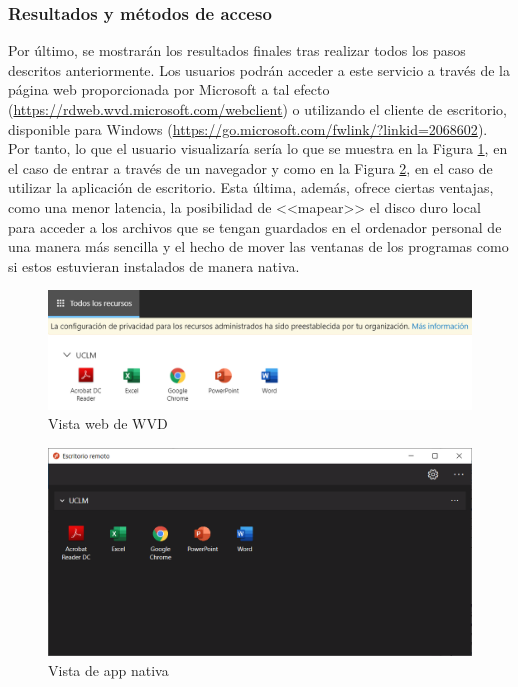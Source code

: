 \subsubsection{Resultados y métodos de acceso}
Por último, se mostrarán los resultados finales tras realizar todos los pasos descritos anteriormente. Los usuarios podrán acceder a este servicio a través de la página web proporcionada por Microsoft a tal efecto (\url{https://rdweb.wvd.microsoft.com/webclient}) o utilizando el cliente de escritorio, disponible para Windows (\url{https://go.microsoft.com/fwlink/?linkid=2068602}). Por tanto, lo que el usuario visualizaría sería lo que se muestra en la Figura \ref{fig:web_alu}, en el caso de entrar a través de un navegador y como en la Figura \ref{fig:rd_alu}, en el caso de utilizar la aplicación de escritorio. Esta última, además, ofrece ciertas ventajas, como una menor latencia, la posibilidad de <<mapear>> el disco duro local para acceder a los archivos que se tengan guardados en el ordenador personal de una manera más sencilla y el hecho de mover las ventanas de los programas como si estos estuvieran instalados de manera nativa.

\begin{figure}[h]
  \centering
  \includegraphics[width=0.8\linewidth]{figures/images/casos_uso/web_alu.PNG}
  \caption{Vista web de \acs{WVD}}
  \label{fig:web_alu}
\end{figure}

\begin{figure}[h]
  \centering
  \includegraphics[width=0.8\linewidth]{figures/images/casos_uso/rd_alu.PNG}
  \caption{Vista de app nativa}
  \label{fig:rd_alu}
\end{figure}

